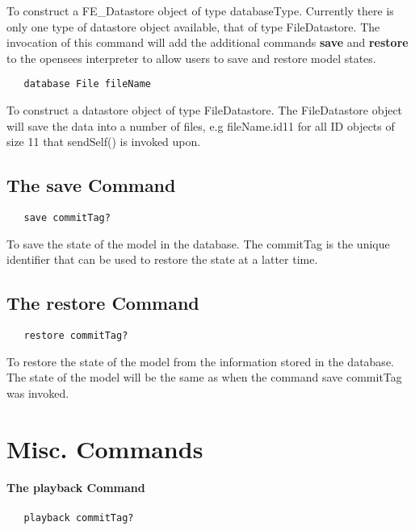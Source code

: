 \documentclass[12pt]{article}
\begin{document}
\noindent To construct a FE\_Datastore object of type
databaseType. Currently there is only one type of datastore object
available, that of type FileDatastore. The invocation of this command
will add the additional commands {\bf save} and {\bf restore} to the
opensees interpreter to allow users to save and restore model states.

{\sf\small
\begin{verbatim}
   database File fileName
\end{verbatim}
} 

\noindent To construct a datastore object of type FileDatastore. The
FileDatastore object will save the data into a number of files, e.g
fileName.id11 for all ID objects of size 11 that sendSelf() is invoked
upon.

\subsection {The save Command}
{\sf\small
\begin{verbatim}
   save commitTag?
\end{verbatim}
} 

\noindent To save the state of the model in the database. The
commitTag is the unique identifier that can be used to restore the
state at a latter time.


\subsection {The restore Command}
{\sf\small
\begin{verbatim}
   restore commitTag?
\end{verbatim}
} 

\noindent To restore the state of the model from the information
stored in the database. The state of the model will be the same as 
when the command save commitTag was invoked.


\section {Misc. Commands}

\paragraph {The playback Command}

{\sf\small
\begin{verbatim}
   playback commitTag?
\end{verbatim}
}
\end{document}
